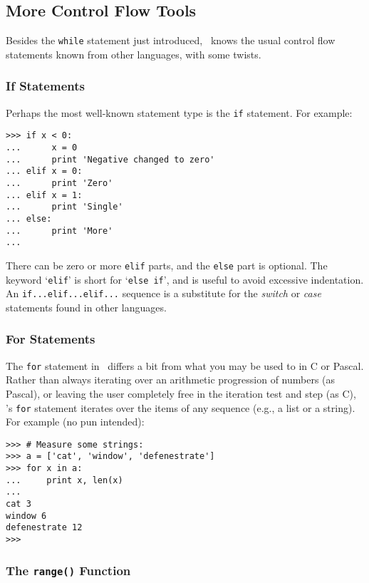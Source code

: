 \subsection{More Control Flow Tools}

Besides the {\tt while} statement just introduced, \Python\ knows the
usual control flow statements known from other languages, with some
twists.

\subsubsection{If Statements}

Perhaps the most well-known statement type is the {\tt if} statement.
For example:
\bcode\begin{verbatim}
>>> if x < 0:
...      x = 0
...      print 'Negative changed to zero'
... elif x = 0:
...      print 'Zero'
... elif x = 1:
...      print 'Single'
... else:
...      print 'More'
... 
\end{verbatim}\ecode
There can be zero or more {\tt elif} parts, and the {\tt else} part is
optional.
The keyword `{\tt elif}' is short for `{\tt else if}', and is useful to
avoid excessive indentation.
An {\tt if...elif...elif...} sequence is a substitute for the
{\em switch} or {\em case} statements found in other languages.

\subsubsection{For Statements}

The {\tt for} statement in \Python\ differs a bit from what you may be
used to in C or Pascal.
Rather than always iterating over an arithmetic progression of numbers
(as Pascal), or leaving the user completely free in the iteration test
and step (as C), \Python's {\tt for} statement iterates over the items
of any sequence (e.g., a list or a string).
For example (no pun intended):
\bcode\begin{verbatim}
>>> # Measure some strings:
>>> a = ['cat', 'window', 'defenestrate']
>>> for x in a:
...     print x, len(x)
... 
cat 3
window 6
defenestrate 12
>>> 
\end{verbatim}\ecode

\subsubsection{The {\tt range()} Function}

